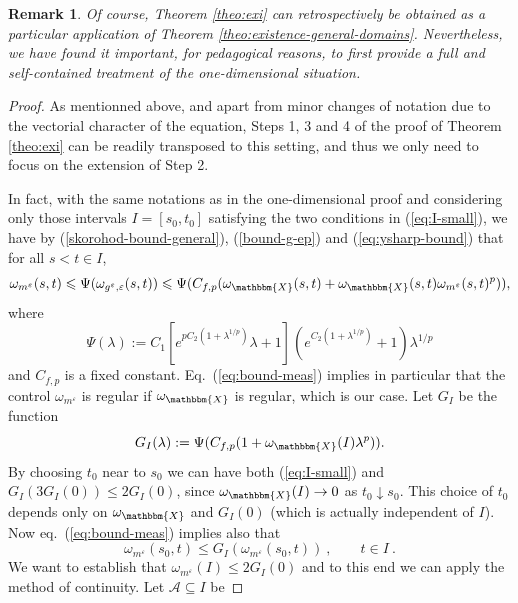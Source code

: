 \documentclass[11pt,reqno,oneside]{amsart}
\numberwithin{equation}{section}
\newcommand{\assign}{:=}
\newtheorem{remark}[theorem]{Remark}
\begin{document}
\begin{remark}
Of course, Theorem \ref{theo:exi} can retrospectively be obtained as a particular application of Theorem \ref{theo:existence-general-domains}. Nevertheless, we have found it important, for pedagogical reasons, to first provide a full and self-contained treatment of the one-dimensional situation.   
\end{remark}

\begin{proof}
As mentionned above, and apart from minor changes of notation due to the vectorial character of the equation, Steps 1, 3 and 4 of the proof of Theorem \ref{theo:exi} can  be readily transposed to this setting, and thus we only need to focus on the extension of Step 2.

\smallskip

In fact,  with the same notations as in the one-dimensional proof and considering only those intervals $I = [s_0,t_0]$ satisfying the two conditions in (\ref{eq:I-small}), we have by (\ref{skorohod-bound-general}), (\ref{bound-g-ep}) and (\ref{eq:ysharp-bound}) that for all $s<t \in I$,
  \begin{equation}
    \omega_{m^{\varepsilon}} (s, t) \leqslant \Psi (\omega_{g^{\varepsilon}, \varepsilon}
    (s, t)) \leqslant \Psi (C_{f,p}  (\omega_{\mathbbm{X}} (s, t) +
    \omega_{\mathbbm{X}} (s, t) \omega_{m^{\varepsilon}} (s, t)^p)),
    \label{eq:bound-meas}
  \end{equation}
  where
  \[ \Psi (\lambda) \assign C_1  [e^{p C_2 (1 + \lambda^{1 / p})} \lambda +
     1]^{} (e^{C_2 (1 + \lambda^{1 / p})} + 1) \lambda^{1 / p}  \]
	and $C_{f,p}$ is a fixed constant. Eq.~(\ref{eq:bound-meas}) implies in particular that the control
  $\omega_{m^{\varepsilon}}$ is regular  if $\omega_{\mathbbm{X}}$ is
  regular, which is our case. Let $G_I$ be the function
  \[ G_I (\lambda) \assign \Psi (C_{f,p}  (1 + \omega_{\mathbbm{X}} (I)
     \lambda^p)) . \]
  By choosing $t_0$ near to $s_0$ we can have both (\ref{eq:I-small}) and $G_I (3 G_I (0)) \leqslant 2 G_I
  (0)$, since $\omega_{\mathbbm{X}} (I) \rightarrow 0$ as $t_0 \downarrow s_0$.
  This choice of $t_0$ depends only on $\omega_{\mathbbm{X}}$ and $G_I(0)$ (which is actually independent of $I$). Now
  eq.~(\ref{eq:bound-meas}) implies also that
  \[ \omega_{m^{\varepsilon}} (s_0, t) \leqslant G_I (\omega_{m^{\varepsilon}}
     (s_0, t))\ , \qquad t \in I \ . \]
  We want to establish that $\omega_{m^{\varepsilon}} (I) \leqslant 2 G_I
  (0)$ and to this end we can apply the method of continuity. Let $\mathcal{A} \subseteq I$ be

\end{proof}
\end{document}
